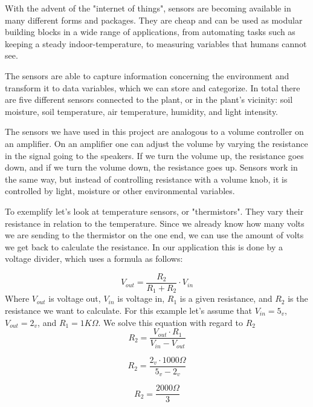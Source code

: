 With the advent of the "internet of things", sensors are becoming available in many different forms and packages. They are cheap and can be used as modular building blocks in a wide range of applications, from automating tasks such as keeping a steady indoor-temperature, to measuring variables that humans cannot see. 

The sensors are able to capture information concerning the environment and transform it to data variables, which we can store and categorize. In total there are five different sensors connected to the plant, or in the plant’s vicinity: soil moisture, soil temperature, air temperature, humidity, and light intensity. 



The sensors we have used in this project are analogous to a volume controller on an amplifier. On an amplifier one can adjust the volume by varying the resistance in the signal going to the speakers. If we turn the volume up, the resistance goes down, and if we turn the volume down, the resistance goes up. Sensors work in the same way, but instead of controlling resistance with a volume knob, it is controlled by light, moisture or other environmental variables. 

To exemplify let's look at temperature sensors, or "thermistors". They vary their resistance in relation to the temperature. Since we already know how many volts we are sending to the thermistor on the one end, we can use the amount of volts we get back to calculate the resistance. In our application this is done by a voltage divider, which uses a formula as follows: 

\begin{equation}
V_{out}=\frac{R_{2}}{R_{1}+R_{2}}\cdot V_{in} 
\label{eq:vdiv1}
\end{equation}
Where $V_{out}$ is voltage out, $V_{in}$ is voltage in, $R_{1}$ is a given resistance, and $R_{2}$ is the resistance we want to calculate. For this example let's assume that $V_{in} = 5_{v}$, $V_{out} = 2_{v}$, and $R_{1} = 1K\Omega$. We solve this equation with regard to $R_{2}$
\begin{equation}
R_{2} = \frac{V_{out} \cdot R_{1}}{V_{in}-V_{out}}
\end{equation} 

\begin{equation}
R_{2} = \frac{2_{v} \cdot 1000\Omega}{5_{v}-2_{v}}
\end{equation} 

\begin{equation}
R_{2} = \frac{2000\Omega}{3}
\end{equation} 

